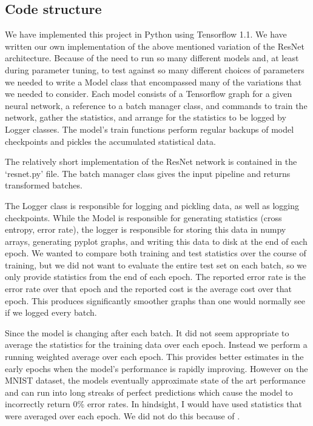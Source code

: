 \documentclass[english,a4paper,oneside]{amsart}
\theoremstyle{definition}
\begin{document}
\subsection{Code structure}
We have implemented this project in Python using Tensorflow 1.1. We have written our own implementation of the above mentioned variation of the ResNet architecture. Because of the need to run so many different models and, at least during parameter tuning, to test against so many different choices of parameters we needed to write a Model class that encompassed many of the variations that we needed to consider. Each model consists of a Tensorflow graph for a given neural network, a reference to a batch manager class, and commands to train the network, gather the statistics, and arrange for the statistics to be logged by Logger classes. The model's train functions perform regular backups of model checkpoints and pickles the accumulated statistical data.

The relatively short implementation of the ResNet network is contained in the `resnet.py' file. The batch manager class gives the input pipeline and returns transformed batches. 

The Logger class is responsible for logging and pickling data, as well as logging checkpoints. While the Model is responsible for generating statistics (cross entropy, error rate), the logger is responsible for storing this data in numpy arrays, generating pyplot graphs, and writing this data to disk at the end of each epoch. We wanted to compare both training and test statistics over the course of training, but we did not want to evaluate the entire test set on each batch, so we only provide statistics from the end of each epoch. The reported error rate is the error rate over that epoch and the reported cost is the average cost over that epoch. This produces significantly smoother graphs than one would normally see if we logged every batch. 

\begin{remark}
Since the model is changing after each batch. It did not seem appropriate to average the statistics for the training data over each epoch. Instead we perform a running weighted average over each epoch. This provides better estimates in the early epochs when the model's performance is rapidly improving. However on the MNIST dataset, the models eventually approximate state of the art performance and can run into long streaks of perfect predictions which cause the model to incorrectly return 0\% error rates. In hindsight, I would have used statistics that were averaged over each epoch. We did not do this because of .
\end{remark}
\end{document}
